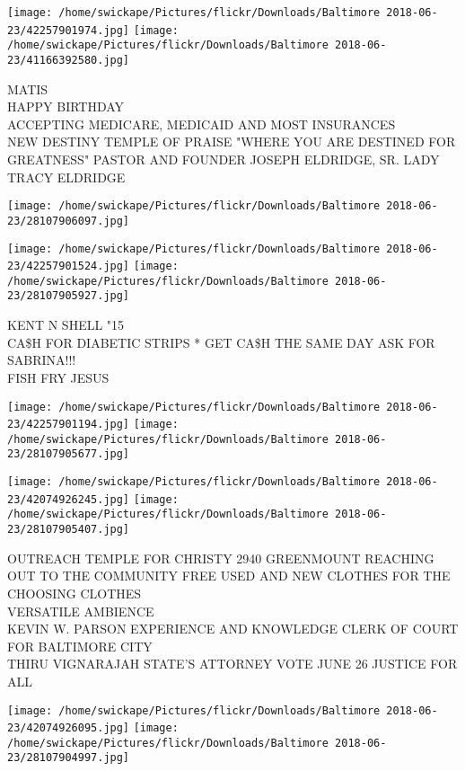 \documentclass[10pt,letterpaper]{article}
\begin{document}
\texttt{[image: /home/swickape/Pictures/flickr/Downloads/Baltimore 2018-06-23/42257901974.jpg]}
\texttt{[image: /home/swickape/Pictures/flickr/Downloads/Baltimore 2018-06-23/41166392580.jpg]}

MATIS\\
HAPPY BIRTHDAY\\
ACCEPTING MEDICARE, MEDICAID AND MOST INSURANCES\\
NEW DESTINY TEMPLE OF PRAISE "WHERE YOU ARE DESTINED FOR GREATNESS"  PASTOR AND FOUNDER JOSEPH ELDRIDGE, SR.  LADY TRACY ELDRIDGE
\pagebreak

\texttt{[image: /home/swickape/Pictures/flickr/Downloads/Baltimore 2018-06-23/28107906097.jpg]}

\vspace{0.25in}
\texttt{[image: /home/swickape/Pictures/flickr/Downloads/Baltimore 2018-06-23/42257901524.jpg]}
\texttt{[image: /home/swickape/Pictures/flickr/Downloads/Baltimore 2018-06-23/28107905927.jpg]}

KENT N SHELL "15\\
CA\$H FOR DIABETIC STRIPS * GET CA\$H THE SAME DAY ASK FOR SABRINA!!!\\
FISH FRY JESUS
\pagebreak

\texttt{[image: /home/swickape/Pictures/flickr/Downloads/Baltimore 2018-06-23/42257901194.jpg]}
\texttt{[image: /home/swickape/Pictures/flickr/Downloads/Baltimore 2018-06-23/28107905677.jpg]}

\texttt{[image: /home/swickape/Pictures/flickr/Downloads/Baltimore 2018-06-23/42074926245.jpg]}
\texttt{[image: /home/swickape/Pictures/flickr/Downloads/Baltimore 2018-06-23/28107905407.jpg]}

OUTREACH TEMPLE FOR CHRISTY 2940 GREENMOUNT REACHING OUT TO THE COMMUNITY FREE USED AND NEW CLOTHES FOR THE CHOOSING CLOTHES\\
VERSATILE AMBIENCE\\
KEVIN W. PARSON EXPERIENCE AND KNOWLEDGE CLERK OF COURT FOR BALTIMORE CITY\\
THIRU VIGNARAJAH STATE'S ATTORNEY VOTE JUNE 26 JUSTICE FOR ALL
\pagebreak

\texttt{[image: /home/swickape/Pictures/flickr/Downloads/Baltimore 2018-06-23/42074926095.jpg]}
\texttt{[image: /home/swickape/Pictures/flickr/Downloads/Baltimore 2018-06-23/28107904997.jpg]}
\end{document}
